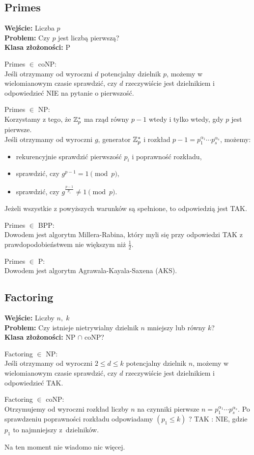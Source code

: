 \subsection{Primes}
\textbf{Wejście:} Liczba \( p \) \\
\textbf{Problem:} Czy \( p \) jest liczbą pierwszą? \\
\textbf{Klasa złożoności:} P

Primes \( \in \) coNP: \\
Jeśli otrzymamy od wyroczni \( d \) potencjalny dzielnik \( p \), możemy w wielomianowym czasie sprawdzić, czy \( d \) rzeczywiście jest dzielnikiem i odpowiedzieć NIE na pytanie o pierwszość.

Primes \( \in \) NP: \\
Korzystamy z tego, że \( \mathbb{Z}_p^* \) ma rząd równy \( p-1 \) wtedy i tylko wtedy, gdy \( p \) jest pierwsze. \\
Jeśli otrzymamy od wyroczni \( g \), generator \( \mathbb{Z}_p^* \) i rozkład \( p-1 = p_1^{\alpha_1} \cdots p_s^{\alpha_s} \), możemy:
\begin{itemize}
    \item rekurencyjnie sprawdzić pierwszość \( p_i \) i poprawność rozkładu,
    \item sprawdzić, czy \( g^{p-1} = 1 \pmod{p} \),
    \item sprawdzić, czy \( g^{\frac{p-1}{p_i}} \neq 1 \pmod{p} \).
\end{itemize}
Jeżeli wszystkie z powyższych warunków są spełnione, to odpowiedzią jest TAK.

\newpage
Primes \( \in \) BPP: \\
Dowodem jest algorytm Millera-Rabina, który myli się przy odpowiedzi TAK z prawdopodobieństwem nie większym niż \( \frac{1}{2} \).

Primes \( \in \) P: \\
Dowodem jest algorytm Agrawala-Kayala-Saxena (AKS).

\subsection{Factoring}
\textbf{Wejście:} Liczby \( n,\; k \) \\
\textbf{Problem:} Czy istnieje nietrywialny dzielnik \( n \) mniejszy lub równy \( k \)? \\
\textbf{Klasa złożoności:} NP \( \cap \) coNP?

Factoring \( \in \) NP: \\
Jeśli otrzymamy od wyroczni \( 2 \leq d \leq k \) potencjalny dzielnik \( n \), możemy w wielomianowym czasie sprawdzić, czy \( d \) rzeczywiście jest dzielnikiem i odpowiedzieć TAK.

Factoring \( \in \) coNP: \\
Otrzymujemy od wyroczni rozkład liczby \( n \) na czynniki pierwsze \( n = p_1^{\alpha_1} \cdots p_s^{\alpha_s} \). Po sprawdzeniu poprawności rozkładu odpowiadamy \( (p_1 \leq k) \) ? TAK : NIE, gdzie \( p_1 \) to najmniejszy z~dzielników.

Na ten moment nie wiadomo nic więcej.